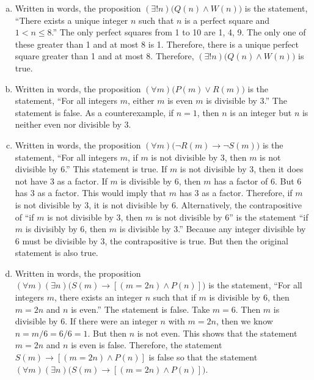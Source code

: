 \documentclass[11pt,letterpaper]{article}
\begin{document}
\sol
\begin{enumerate}[(a)]
\item Written in words, the proposition $(\exists! n) \big( Q(n) \wedge W(n) \big)$ is the statement, ``There exists a unique integer $n$ such that $n$ is a perfect square and $1 < n \leq 8$.'' The only perfect squares from 1 to 10 are 1, 4, 9. The only one of these greater than 1 and at most 8 is 1. Therefore, there is a unique perfect square greater than 1 and at most 8. Therefore, $(\exists! n) \big( Q(n) \wedge W(n) \big)$ is true. \pspace

\item Written in words, the proposition $(\forall m) \big( P(m) \vee R(m) \big)$ is the statement, ``For all integers $m$, either $m$ is even $m$ is divisible by 3.'' The statement is false. As a counterexample, if $n= 1$, then $n$ is an integer but $n$ is neither even nor divisible by 3. \pspace
 
\item Written in words, the proposition $(\forall m) \big( \neg R(m) \to \neg S(m) \big)$ is the statement, ``For all integers $m$, if $m$ is not divisible by 3, then $m$ is not divisible by 6.'' This statement is true. If $m$ is not divisible by 3, then it does not have 3 as a factor. If $m$ is divisible by 6, then $m$ has a factor of 6. But 6 has 3 as a factor. This would imply that $m$ has 3 as a factor. Therefore, if $m$ is not divisible by 3, it is not divisible by 6. Alternatively, the contrapositive of ``if $m$ is not divisible by 3, then $m$ is not divisible by 6'' is the statement ``if $m$ is divisibly by 6, then $m$ is divisible by 3.'' Because any integer divisible by 6 must be divisible by 3, the contrapositive is true. But then the original statement is also true. \pspace


\item Written in words, the proposition $(\forall m) (\exists n) \big( S(m) \to [(m= 2n) \wedge P(n)] \big)$ is the statement, ``For all integers $m$, there exists an integer $n$ such that if $m$ is divisible by 6, then $m= 2n$ and $n$ is even.'' The statement is false. Take $m= 6$. Then $m$ is divisible by 6. If there were an integer $n$ with $m= 2n$, then we know $n= m/6= 6/6= 1$. But then $n$ is not even. This shows that the statement $m= 2n$ and $n$ is even is false. Therefore, the statement $S(m) \to [(m= 2n) \wedge P(n)]$ is false so that the statement $(\forall m) (\exists n) \big( S(m) \to [(m= 2n) \wedge P(n)] \big)$. 
\end{enumerate}
\end{document}
